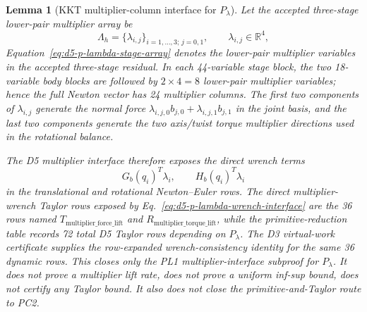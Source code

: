 \documentclass[preprint,12pt]{elsarticle}
\newtheorem{lemma}{Lemma}
\begin{document}
\begin{lemma}[KKT multiplier-column interface for \(P_{\lambda}\)]
\label{lem:d5-p-lambda-interface}
Let the accepted three-stage lower-pair multiplier array be
\begin{equation}
\label{eq:d5-p-lambda-stage-array}
\Lambda_h=\{\lambda_{i,j}\}_{i=1,\ldots,3;\,j=0,1},\qquad
\lambda_{i,j}\in\mathbb R^4,
\end{equation}
Equation~\eqref{eq:d5-p-lambda-stage-array} denotes the lower-pair multiplier variables in the accepted three-stage
residual.  In each 44-variable stage block, the two 18-variable body blocks
are followed by \(2\times4=8\) lower-pair multiplier variables; hence the
full Newton vector has 24 multiplier columns.  The first two components of
\(\lambda_{i,j}\) generate the normal force
\(\lambda_{i,j,0}b_{j,0}+\lambda_{i,j,1}b_{j,1}\) in the joint basis, and
the last two components generate the two axis/twist torque multiplier
directions used in the rotational balance.

The D5 multiplier interface therefore exposes the direct wrench terms
\begin{equation}
\label{eq:d5-p-lambda-wrench-interface}
G_b(q_i)^{T}\lambda_i,\qquad H_b(q_i)^{T}\lambda_i
\end{equation}
in the translational and rotational Newton--Euler rows.  The direct
multiplier-wrench Taylor rows exposed by Eq.~\eqref{eq:d5-p-lambda-wrench-interface}
are the 36 rows named
\(T_{\mathrm{multiplier\_force\_lift}}\) and
\(R_{\mathrm{multiplier\_torque\_lift}}\), while the primitive-reduction
table records 72 total D5 Taylor rows depending on \(P_{\lambda}\).
The D3 virtual-work certificate supplies the row-expanded wrench-consistency
identity for the same 36 dynamic rows.  This closes only the PL1
multiplier-interface subproof for \(P_{\lambda}\). It does not prove a
multiplier lift rate, does not prove a uniform inf-sup bound, does not
certify any Taylor bound. It also does not close the primitive-and-Taylor
route to PC2.
\end{lemma}
\end{document}
